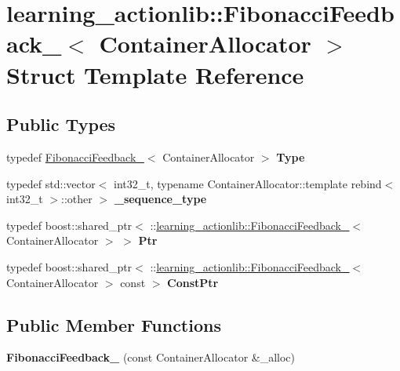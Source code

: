 \hypertarget{structlearning__actionlib_1_1FibonacciFeedback__}{}\section{learning\+\_\+actionlib\+:\+:Fibonacci\+Feedback\+\_\+$<$ Container\+Allocator $>$ Struct Template Reference}
\label{structlearning__actionlib_1_1FibonacciFeedback__}
\subsection*{Public Types}
\begin{DoxyCompactItemize}
\item 
\mbox{\label{structlearning__actionlib_1_1FibonacciFeedback___aa67c36a35a2263fa78599f5963acac7e}} 
typedef \hyperlink{structlearning__actionlib_1_1FibonacciFeedback__}{Fibonacci\+Feedback\+\_\+}$<$ Container\+Allocator $>$ {\bfseries Type}
\item 
\mbox{\label{structlearning__actionlib_1_1FibonacciFeedback___ab37169cf9e6bcf54df6541c8758ecac7}} 
typedef std\+::vector$<$ int32\+\_\+t, typename Container\+Allocator\+::template rebind$<$ int32\+\_\+t $>$\+::other $>$ {\bfseries \+\_\+sequence\+\_\+type}
\item 
\mbox{\label{structlearning__actionlib_1_1FibonacciFeedback___a31993ff7e42e87279bc2658fb9790de1}} 
typedef boost\+::shared\+\_\+ptr$<$ \+::\hyperlink{structlearning__actionlib_1_1FibonacciFeedback__}{learning\+\_\+actionlib\+::\+Fibonacci\+Feedback\+\_\+}$<$ Container\+Allocator $>$ $>$ {\bfseries Ptr}
\item 
\mbox{\label{structlearning__actionlib_1_1FibonacciFeedback___a45db7d7fa0211ffedfd2c0937f9ff03a}} 
typedef boost\+::shared\+\_\+ptr$<$ \+::\hyperlink{structlearning__actionlib_1_1FibonacciFeedback__}{learning\+\_\+actionlib\+::\+Fibonacci\+Feedback\+\_\+}$<$ Container\+Allocator $>$ const  $>$ {\bfseries Const\+Ptr}
\end{DoxyCompactItemize}
\subsection*{Public Member Functions}
\begin{DoxyCompactItemize}
\item 
\mbox{\label{structlearning__actionlib_1_1FibonacciFeedback___a64a2734901d19ff40425d0a6b4767f24}} 
{\bfseries Fibonacci\+Feedback\+\_\+} (const Container\+Allocator \&\+\_\+alloc)
\end{DoxyCompactItemize}
